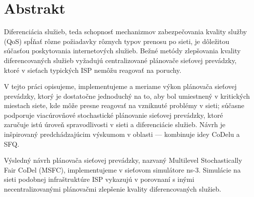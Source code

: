 \documentclass[12pt,a4paper]{report}
\title{}
\author{}
\begin{document}
	\pagestyle{empty}
\section*{Abstrakt}
Diferenciácia služieb, teda schopnosť mechanizmov zabezpečovania kvality služby (QoS) spĺňať rôzne požiadavky rôznych typov prenosu po sieti, je dôležitou súčasťou poskytovania internetových služieb. Bežné metódy zlepšovania kvality diferencovaných služieb vyžadujú centralizované plánovače sieťovej prevádzky, ktoré v sieťach typických ISP nemôžu reagovať na poruchy.

V tejto práci opisujeme, implementujeme a meriame výkon plánovača sieťovej prevádzky, ktorý je dostatočne jednoduchý na to, aby bol umiestnený v kritických miestach siete, kde môže presne reagovať na vzniknuté problémy v sieti; súčasne podporuje viacúrovňové stochastické plánovanie sieťovej prevádzky, ktoré zaručuje istú úroveň spravodlivosti v sieti a diferenciácie služieb. Návrh je inšpirovaný predchádzajúcim výskumom v oblasti --- kombinuje idey CoDelu a SFQ.

Výsledný návrh plánovača sieťovej prevádzky, nazvaný Multilevel Stochastically Fair CoDel (MSFC), implementujeme v sieťovom simulátore ns-3. Simulácie na sieti podobnej infraštruktúre ISP vykazujú v porovnaní s inými necentralizovanými plánovačmi zlepšenie kvality diferencovaných služieb.
\end{document}
